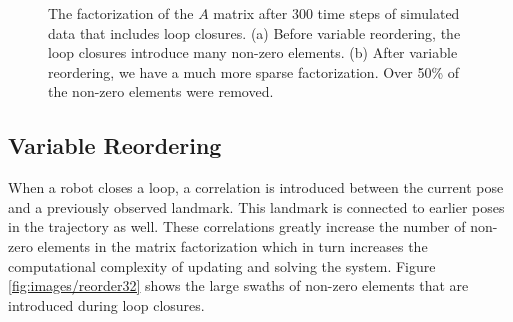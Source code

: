 \documentclass[conference]{IEEEtran}
\begin{document}
\begin{figure}[t]
  \begin{center}
    \caption{The factorization of the $A$ matrix after 300 time steps of simulated data
      that includes loop closures. (a) Before variable reordering, the loop closures
      introduce many non-zero elements. (b) After variable reordering, we have a much more
    sparse factorization. Over 50\% of the non-zero elements were removed.}
    \label{fig:reorder}
  \end{center}
\end{figure}

\subsection{Variable Reordering}
\label{sub:variablereordering}

When a robot closes a loop, a correlation is introduced between the current pose and a
previously observed landmark. This landmark is connected to earlier poses in the
trajectory as well. These correlations greatly increase the number of non-zero elements in
the matrix factorization which in turn increases the computational complexity of updating
and solving the system. Figure \ref{fig:images/reorder32} shows the large swaths of
non-zero elements that are introduced during loop closures. 
\end{document}
